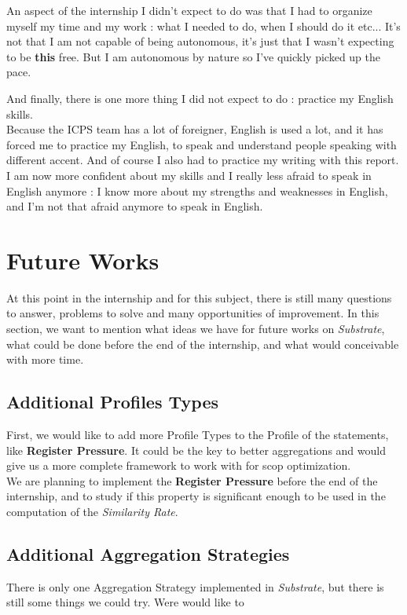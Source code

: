 \documentclass[paper=a4, fontsize=11.5pt]{scrartcl}
\numberwithin{equation}{section}        %
\numberwithin{figure}{section}          %
\numberwithin{table}{section}               %
\begin{document}
        An aspect of the internship I didn't expect to do was that I had to organize myself
        my time and my work : what I needed to do, when I should do it etc... It's not that I
        am not capable of being autonomous, it's just that I wasn't expecting to be
        \textbf{this} free. But I am autonomous by nature so I've quickly picked up the pace.

        And finally, there is one more thing I did not expect to do : practice my English skills.\\
        Because the ICPS team has a lot of foreigner, English is used a lot, and it has forced
        me to practice my English, to speak and understand people speaking with different accent.
        And of course I also had to practice my writing with this report.
        I am now more confident about my skills and I really less afraid to speak in English
        anymore : I know more about my strengths and weaknesses in English, and I'm not that
        afraid anymore to speak in English.


\section{Future Works}
\label{sec:future_works}
At this point in the internship and for this subject, there is still many
questions to answer, problems to solve and many opportunities of improvement.
In this section, we want to mention what ideas we have for future works on \textit{Substrate},
what could be done before the end of the internship, and what would conceivable with more time.
    \subsection{Additional Profiles Types}
        First, we would like to add more Profile Types to the Profile of the statements,
        like \textbf{Register Pressure}. It could be the key to better aggregations and would
        give us a more complete framework to work with for scop optimization.\\

        We are planning to implement the \textbf{Register Pressure} before the end of the
        internship, and to study if this property is significant enough to be used in the
        computation of the \textit{Similarity Rate}.
    \subsection{Additional Aggregation Strategies}
        There is only one Aggregation Strategy implemented in \textit{Substrate}, but
        there is still some things we could try. Were would like to 
\end{document}

